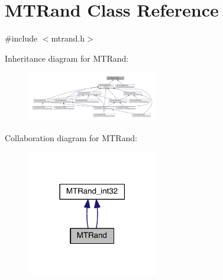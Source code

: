 \hypertarget{a00016}{\section{M\-T\-Rand Class Reference}
\label{a00016}
}


{\ttfamily \#include $<$mtrand.\-h$>$}



Inheritance diagram for M\-T\-Rand\-:
\nopagebreak
\begin{figure}[H]
\begin{center}
\leavevmode
\includegraphics[width=162pt]{a00210}
\end{center}
\end{figure}


Collaboration diagram for M\-T\-Rand\-:
\nopagebreak
\begin{figure}[H]
\begin{center}
\leavevmode
\includegraphics[width=162pt]{a00211}
\end{center}
\end{figure}
